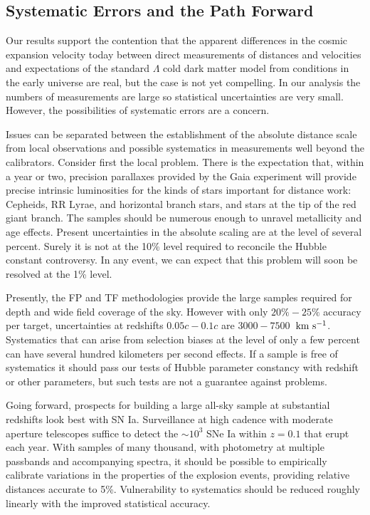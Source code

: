 \documentclass[twocolumn]{aastex63}
\newcommand{\kms}{\mbox{${\rm km~s^{-1}}$}}
\begin{document}

\subsection{Systematic Errors and the Path Forward}

Our results support the contention that the apparent differences in the cosmic expansion velocity today between direct measurements of distances and velocities and expectations of the standard $\Lambda$ cold dark matter model from conditions in the early universe are real, but the case is not yet compelling.  In our analysis the numbers of measurements are large so statistical uncertainties are very small.  However, the possibilities of systematic errors are a concern.

Issues can be separated between the establishment of the absolute distance scale from local observations and possible systematics in measurements well beyond the calibrators.  Consider first the local problem.  There is the expectation that, within a year or two, precision parallaxes provided by the Gaia experiment will provide precise intrinsic luminosities for the kinds of stars important for distance work: Cepheids, RR Lyrae, and horizontal branch stars, and stars at the tip of the red giant branch.  The samples should be numerous enough to unravel metallicity and age effects.  Present uncertainties in the absolute scaling are at the level of several percent.  Surely it is not at the 10\% level required to reconcile the Hubble constant controversy.  In any event, we can expect that this problem will soon be resolved at the 1\% level.

Presently, the FP and TF methodologies provide the large samples required for depth and wide field coverage of the sky.  However with only $20\%-25\%$ accuracy per target, uncertainties at redshifts $0.05c-0.1c$ are $3000-7500$~\kms.  Systematics that can arise from selection biases at the level of only a few percent can have several hundred kilometers per second effects. If a sample is free of systematics it should pass our tests of Hubble parameter constancy with redshift or other parameters, but such tests are not a guarantee against problems.

Going forward, prospects for building a large all-sky sample at substantial redshifts look best with SN Ia.  Surveillance at high cadence with moderate aperture telescopes suffice to detect the $\sim 10^3$ SNe Ia within $z=0.1$ that erupt each year.  With samples of many thousand, with photometry at multiple passbands and accompanying spectra, it should be possible to empirically calibrate variations in the properties of the explosion events, providing relative distances accurate to 5\%.  Vulnerability to systematics should be reduced roughly linearly with the improved statistical accuracy.
\end{document}
